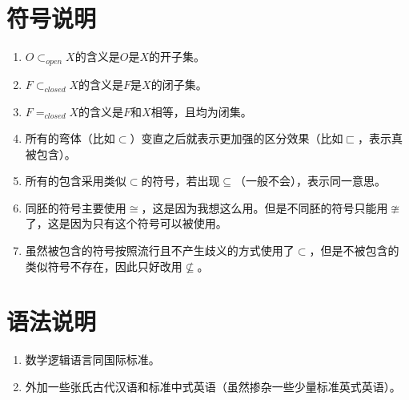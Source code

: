 \documentclass[lang=cn,10pt,device=pad]{elegantbook}
\begin{document}
\section{符号说明}
\begin{enumerate}
	\item $O\subset_{open}X$的含义是$O$是$X$的开子集。
	\item $F\subset_{closed}X$的含义是$F$是$X$的闭子集。
	\item $F=_{closed}X$的含义是$F$和$X$相等，且均为闭集。
	\item 所有的弯体（比如$\subset$）变直之后就表示更加强的区分效果（比如$\sqsubset$，表示真被包含）。
	\item 所有的包含采用类似$\subset$的符号，若出现$\subseteq$（一般不会），表示同一意思。
	\item 同胚的符号主要使用$\cong$，这是因为我想这么用。但是不同胚的符号只能用$\ncong$了，这是因为只有这个符号可以被使用。
	\item 虽然被包含的符号按照流行且不产生歧义的方式使用了$\subset$，但是不被包含的类似符号不存在，因此只好改用$\nsubseteq$。
\end{enumerate}
\section{语法说明}
\begin{enumerate}
	\item 数学逻辑语言同国际标准。
	\item 外加一些张氏古代汉语和标准中式英语（虽然掺杂一些少量标准英式英语）。
\end{enumerate}

\printindex
\end{document}
